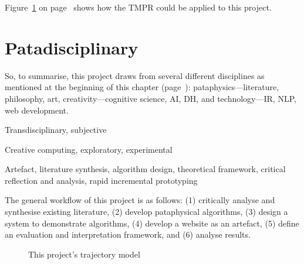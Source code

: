 Figure~\ref{fig:ftmpr} on page~\pageref{fig:ftmpr} shows how the \ac{TMPR} could be applied to this project. 


\section{Patadisciplinary}
\label{s:mymeth}

So, to summarise, this project draws from several different disciplines as mentioned at the beginning of this chapter (page~\pageref{ch:methodology}): pataphysics---literature, philosophy, art, creativity---cognitive science, \ac{AI}, \ac{DH}, and technology---\ac{IR}, \ac{NLP}, web development.

\begin{description}[leftmargin=3.2cm]
  \item [Epistemology] Transdisciplinary, subjective
  \item [Methodology] Creative computing, exploratory, experimental
  \item [Methods] Artefact, literature synthesis, algorithm design, theoretical framework, critical reflection and analysis, rapid incremental prototyping
\end{description}

The general workflow of this project is as follows: (1) critically analyse and synthesise existing literature, (2) develop pataphysical algorithms, (3) design a system to demonstrate algorithms, (4) develop a website as an artefact, (5) define an evaluation and interpretation framework, and (6) analyse results.

\begin{figure}[!htbp] %
  \centering
  \caption[This project's trajectory model]{This project's trajectory model}
\label{fig:ftmpr}
\end{figure}

